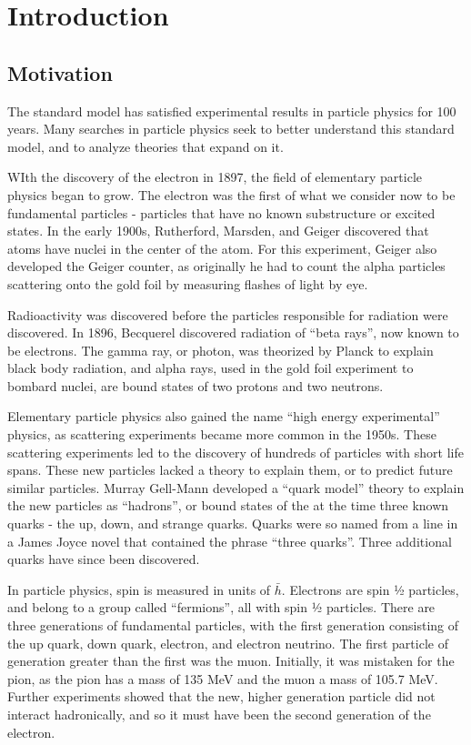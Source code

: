 \chapter{Introduction}\label{chap:intro}

\section{Motivation}\label{sec:ch1:intro}

The standard model has satisfied experimental results in particle physics for 100 years. Many searches in particle physics seek to better understand this standard model, and to analyze theories that expand on it.

WIth the discovery of the electron in 1897, the field of elementary particle physics began to grow. The electron was the first of what we consider now to be fundamental particles - particles that have no known substructure or excited states. In the early 1900s, Rutherford, Marsden, and Geiger discovered that atoms have nuclei in the center of the atom. For this experiment, Geiger also developed the Geiger counter, as originally he had to count the alpha particles scattering onto the gold foil by measuring flashes of light by eye.

Radioactivity was discovered before the particles responsible for radiation were discovered. In 1896, Becquerel discovered radiation of “beta rays”, now known to be electrons. The gamma ray, or photon, was theorized by Planck to explain black body radiation, and alpha rays, used in the gold foil experiment to bombard nuclei, are bound states of two protons and two neutrons. 

Elementary particle physics also gained the name “high energy experimental” physics, as scattering experiments became more common in the 1950s. These scattering experiments led to the discovery of hundreds of particles with short life spans. These new particles lacked a theory to explain them, or to predict future similar particles. Murray Gell-Mann developed a “quark model” theory to explain the new particles as “hadrons”, or bound states of the at the time three known quarks - the up, down, and strange quarks. Quarks were so named from a line in a James Joyce novel that contained the phrase “three quarks”. Three additional quarks have since been discovered.

In particle physics, spin is measured in units of $\bar{h}$. Electrons are spin ½ particles, and belong to a group called “fermions”, all with spin ½ particles. There are three generations of fundamental particles, with the first generation consisting of the up quark, down quark, electron, and electron neutrino. The first particle of generation greater than the first was the muon. Initially, it was mistaken for the pion, as the pion has a mass of 135 MeV and the muon a mass of 105.7 MeV. Further experiments showed that the new, higher generation particle did not interact hadronically, and so it must have been the second generation of the electron.

